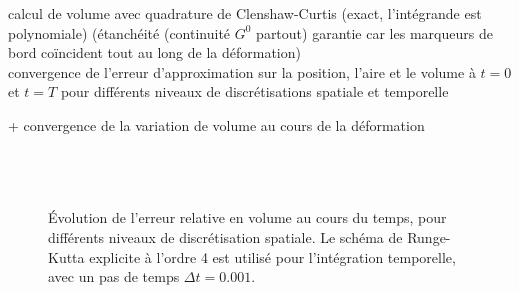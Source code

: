 calcul de volume avec quadrature de Clenshaw-Curtis (exact, l'intégrande est polynomiale) (étanchéité (continuité $G^0$ partout) garantie car les marqueurs de bord coïncident tout au long de la déformation)\\
convergence de l'erreur d'approximation sur la position, l'aire et le volume à $t = 0$ et $t = T$ pour différents niveaux de discrétisations spatiale et temporelle\\

\def\axw{0.48\textwidth}
\def\axh{0.39\textwidth}
\def\xlabl{dof}
\def\ylabl{Erreur}
\def\xsep{2pt}


+ convergence de la variation de volume au cours de la déformation\\
\\
\\
\\
\begin{figure}
  \centering
  \caption{Évolution de l'erreur relative en volume au cours du temps, pour différents niveaux de discrétisation spatiale. Le schéma de Runge-Kutta explicite à l'ordre 4 est utilisé pour l'intégration temporelle, avec un pas de temps $\Delta t = 0.001$.}
\end{figure}

